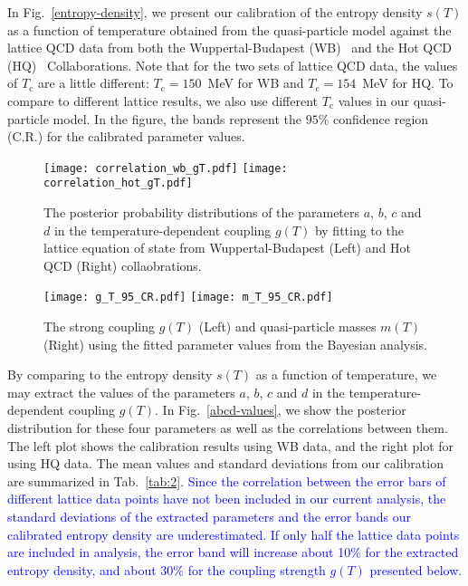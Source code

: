 \documentclass[aps,superscriptaddress,prc,twocolumn,nofootinbib]{revtex4}
\begin{document}
In Fig.~\ref{entropy-density}, we present our calibration of the entropy density $s(T)$ as a function of temperature obtained from the quasi-particle model against the lattice QCD data from both the Wuppertal-Budapest (WB)~\cite{Borsanyi:2013bia} and the Hot QCD (HQ)~\cite{Bazavov:2014pvz} Collaborations. Note that for the two sets of lattice QCD data, the values of $T_\mathrm{c}$ are a little different: $T_\mathrm{c} = 150$~MeV for WB and $T_\mathrm{c} = 154$~MeV for HQ. To compare to different lattice results, we also use different $T_\mathrm{c}$ values in our quasi-particle model. In the figure, the bands represent the $95\%$ confidence region (C.R.) for the calibrated parameter values.


\begin{figure*}[tbh]
\texttt{[image: correlation\_wb\_gT.pdf]}
\texttt{[image: correlation\_hot\_gT.pdf]}
\caption{The posterior probability distributions of the parameters $a$, $b$, $c$ and $d$ in the temperature-dependent coupling $g(T)$ by fitting to the lattice equation of state from Wuppertal-Budapest (Left) and Hot QCD (Right) collaobrations.}
	\label{abcd-values}
\vspace{12pt}
\texttt{[image: g\_T\_95\_CR.pdf]}
\texttt{[image: m\_T\_95\_CR.pdf]}
	\caption{The strong coupling $g(T)$ (Left) and quasi-particle masses $m(T)$ (Right) using the fitted parameter values from the Bayesian analysis.}
	\label{gT-mT}
\end{figure*}


By comparing to the entropy density $s(T)$ as a function of temperature, we may extract the values of the parameters $a$, $b$, $c$ and $d$ in the temperature-dependent coupling $g(T)$. In Fig.~\ref{abcd-values}, we show the posterior distribution for these four parameters as well as the correlations between them. The left plot shows the calibration results using WB data, and the right plot for using HQ data. The mean values and standard deviations from our calibration are summarized in Tab.~\ref{tab:2}. \textcolor{blue}{Since the correlation between the error bars of different lattice data points have not been included in our current analysis, the standard deviations of the extracted parameters and the error bands our calibrated entropy density are underestimated. If only half the lattice data points are included in analysis, the error band will increase about 10\% for the extracted entropy density, and about 30\% for the coupling strength $g(T)$ presented below.}
\end{document}

